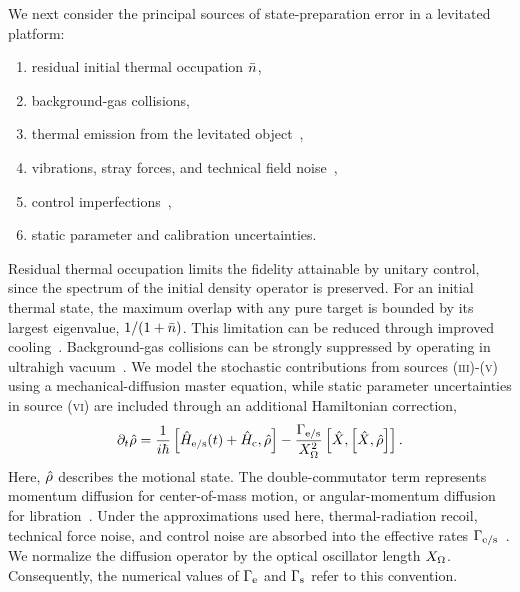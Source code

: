 \documentclass[reprint,prx,footinbib,floatfix,twocolumn,longbibliography,superscriptaddress]{revtex4-2}
\begin{document}
We next consider the principal sources of state-preparation error in a levitated platform:
\begin{enumerate}[label=(\textsc{\roman*})]
\item residual initial thermal occupation $\bar{n}$,
\item background-gas collisions,
\item thermal emission from the levitated object~\cite{Romero-Isart2011a,Hackermuller2004a,Bateman2014,Agrenius2023},
\item vibrations, stray forces, and technical field noise~\cite{Gehm1998,Henkel1999,Schneider1999,Brownnutt2015,Kumph2016},
\item control imperfections~\cite{Grochowski2025a},
\item static parameter and calibration uncertainties.
\end{enumerate}
Residual thermal occupation limits the fidelity attainable by unitary control, since the spectrum of the initial density operator is preserved.
For an initial thermal state, the maximum overlap with any pure target is bounded by its largest eigenvalue, $1/(1+\bar{n})$. 
This limitation can be reduced through improved cooling~\cite{Popp2006,Grochowski2025a}.
Background-gas collisions can be strongly suppressed by operating in ultrahigh vacuum~\cite{Dania2024}.
We model the stochastic contributions from sources (\textsc{iii})-(\textsc{v}) using a mechanical-diffusion master equation, while static parameter uncertainties in source (\textsc{vi}) are included through an additional Hamiltonian correction,
\begin{align}
    \partial_{t} \hat{\rho}= \frac{1}{i \hbar} \left[ \hat{H}_{\text{e} / \text{s}} (t)+\hat{H}_\text{c},\hat{\rho} \right] - \frac{ \Gamma_{\text{e} / \text{s}}}{X_{\Omega}^2} \left[ \hat{X},\left[ \hat{X},\hat{\rho} \right] \right].
    \label{mastereq}
\end{align}
Here, $\hat{\rho}$ describes the motional state.
The double-commutator term represents momentum diffusion for center-of-mass motion, or angular-momentum diffusion for libration~\cite{Romero-Isart2011}.
Under the approximations used here, thermal-radiation recoil, technical force noise, and control noise are absorbed into the effective rates $\Gamma_{\text{e} / \text{s}}$~\cite{Roda-Llordes2024b,Riera-Campeny2024,Dania2025}.
We normalize the diffusion operator by the optical oscillator length $X_{\Omega}$.
Consequently, the numerical values of $\Gamma_{\text{e}}$ and $\Gamma_{\text{s}}$ refer to this convention.
\end{document}

